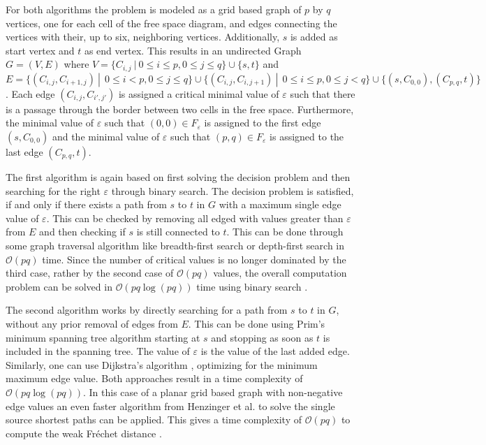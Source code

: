 \documentclass[
oneside,
fontsize=11pt
]{scrartcl}
\begin{document}
For both algorithms the problem is modeled as a grid based graph of $p$ by $q$ vertices, 
one for each cell of the free space diagram,
and edges connecting the vertices with their, up to six, neighboring vertices.
Additionally, $s$ is added as start vertex and $t$ as end vertex.
This results in an undirected Graph $G=(V,E)$ 
where $V = \{C_{i,j} \ | \ 0 \leq i \leq p, 0 \leq j \leq q \} \cup \{s,t\}$
and $E=\{(C_{i,j}, C_{i+1,j}) \ | \ \ 0 \leq i < p, 0 \leq j \leq q\} \cup \{(C_{i,j}, C_{i,j+1}) \ | \ \ 0 \leq i \leq p, 0 \leq j < q\} \cup \{(s, C_{0,0}), (C_{p,q}, t)\}$.
Each edge $(C_{i,j}, C_{i',j'})$ is assigned a critical minimal value of $\varepsilon$ 
such that there is a passage through the border between two cells in the free space. 
Furthermore, the minimal value of $\varepsilon$ such that $(0,0) \in F_\varepsilon$ is assigned to the first edge $(s, C_{0,0})$ 
and the minimal value of $\varepsilon$ such that $(p,q) \in F_\varepsilon$ is assigned to the last edge $(C_{p,q}, t)$. \cite{alt_computing_1995}

The first algorithm is again based on first solving the decision problem 
and then searching for the right $\varepsilon$ through binary search.
The decision problem is satisfied, if and only if there exists a path from $s$ to $t$ in $G$ 
with a maximum single edge value of $\varepsilon$.
This can be checked by removing all edged with values greater than $\varepsilon$ from $E$ 
and then checking if $s$ is still connected to $t$. 
This can be done through some graph traversal algorithm like breadth-first search or depth-first search
in $\mathcal{O}(pq)$ time. \cite{alt_computing_1995}
Since the number of critical values is no longer dominated by the third case,
rather by the second case of $\mathcal{O}(pq)$ values, 
the overall computation problem can be solved in $\mathcal{O}(pq \log (pq))$ time using binary search \cite{van_leusden_novel_2013}. 

The second algorithm works by directly searching for a path from $s$ to $t$ in $G$,
without any prior removal of edges from $E$.
This can be done using Prim's minimum spanning tree algorithm \cite{prim_shortest_1957} starting at $s$ 
and stopping as soon as $t$ is included in the spanning tree. 
The value of $\varepsilon$ is the value of the last added edge.
Similarly, one can use Dijkstra's algorithm \cite{dijkstra_note_1959}, 
optimizing for the minimum maximum edge value.
Both approaches result in a time complexity of $\mathcal{O}(pq \log (pq))$. \cite{alt_computing_1995}
In this case of a planar grid based graph with non-negative edge values 
an even faster algorithm from Henzinger et al. \cite{henzinger_faster_1997} to solve the single source shortest paths 
can be applied. This gives a time complexity of $\mathcal{O}(pq)$ to compute the weak Fréchet distance \cite{van_leusden_novel_2013}.
\end{document}
